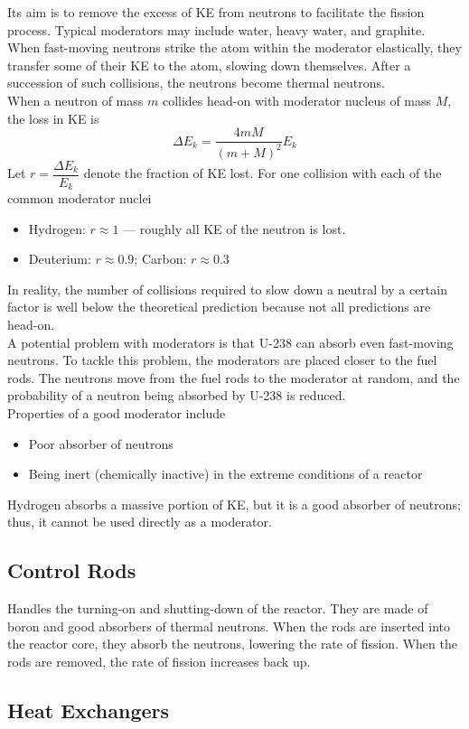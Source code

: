 \documentclass[a4paper,12pt]{article}
\newcommand{\lb}{\\[8pt]}
\begin{document}
Its aim is to remove the excess of KE from neutrons to facilitate the fission process. Typical moderators may include water, heavy water, and graphite.\lb
When fast-moving neutrons strike the atom within the moderator elastically, they transfer some of their KE to the atom, slowing down themselves. After a succession of such collisions, the neutrons become thermal neutrons.\lb
When a neutron of mass $m$ collides head-on with moderator nucleus of mass $M$, the loss in KE is
$$\Delta E_k = \frac{4mM}{(m+M)^2}E_k$$
Let $r = \dfrac{\Delta E_k}{E_k}$ denote the fraction of KE lost. For one collision with each of the common moderator nuclei
\begin{itemize}
  \item Hydrogen: $r \approx 1$ --- roughly all KE of the neutron is lost.
  \item Deuterium: $r \approx 0.9$; Carbon: $r \approx 0.3$
\end{itemize}
In reality, the number of collisions required to slow down a neutral by a certain factor is well below the theoretical prediction because not all predictions are head-on.\lb
A potential problem with moderators is that U-238 can absorb even fast-moving neutrons. To tackle this problem, the moderators are placed closer to the fuel rods. The neutrons move from the fuel rods to the moderator at random, and the probability of a neutron being absorbed by U-238 is reduced.\lb
Properties of a good moderator include
\begin{itemize}
  \item Poor absorber of neutrons
  \item Being inert (chemically inactive) in the extreme conditions of a reactor
\end{itemize}
Hydrogen absorbs a massive portion of KE, but it is a good absorber of neutrons; thus, it cannot be used directly as a moderator.

\subsection{Control Rods}

Handles the turning-on and shutting-down of the reactor. They are made of boron and good absorbers of thermal neutrons. When the rods are inserted into the reactor core, they absorb the neutrons, lowering the rate of fission. When the rods are removed, the rate of fission increases back up.

\subsection{Heat Exchangers}
\end{document}
